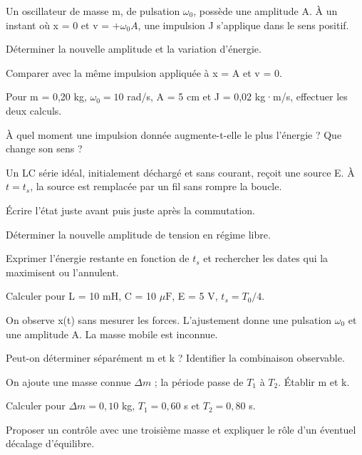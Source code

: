 \label{ex-D1}
Un oscillateur de masse m, de pulsation $\omega_0$, possède une amplitude A. À un instant où x = 0 et v = $+\omega_0A$, une impulsion J s’applique dans le sens positif.\begin{questions}
\item Déterminer la nouvelle amplitude et la variation d’énergie.
\item Comparer avec la même impulsion appliquée à x = A et v = 0.
\item Pour m = 0,20 kg, $\omega_0=10$ rad/s, A = 5 cm et J = 0,02 kg·m/s, effectuer les deux calculs.
\item À quel moment une impulsion donnée augmente-t-elle le plus l’énergie ? Que change son sens ?
\end{questions}


\label{ex-D2}
Un LC série idéal, initialement déchargé et sans courant, reçoit une source E. À $t=t_s$, la source est remplacée par un fil sans rompre la boucle.\begin{questions}
\item Écrire l’état juste avant puis juste après la commutation.
\item Déterminer la nouvelle amplitude de tension en régime libre.
\item Exprimer l’énergie restante en fonction de $t_s$ et rechercher les dates qui la maximisent ou l’annulent.
\item Calculer pour L = 10 mH, C = 10 $\mu\mathrm{ F}$, E = 5 V, $t_s=T_0/4$.
\end{questions}


\label{ex-D3}
On observe x(t) sans mesurer les forces. L’ajustement donne une pulsation $\omega_0$ et une amplitude A. La masse mobile est inconnue.\begin{questions}
\item Peut-on déterminer séparément m et k ? Identifier la combinaison observable.
\item On ajoute une masse connue $\Delta m$ ; la période passe de $T_1$ à $T_2$. Établir m et k.
\item Calculer pour $\Delta m=0{,}10$ kg, $T_1=0{,}60$ s et $T_2=0{,}80$ s.
\item Proposer un contrôle avec une troisième masse et expliquer le rôle d’un éventuel décalage d’équilibre.
\end{questions}


